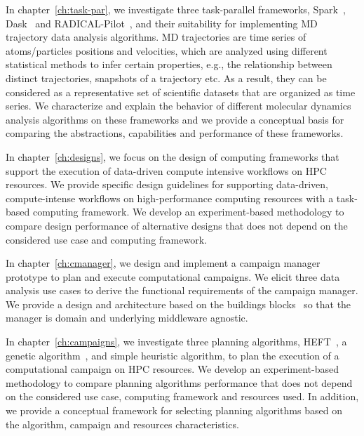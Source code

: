 In chapter~\ref{ch:task-par}, we investigate three task-parallel frameworks,
Spark~\cite{zaharia2010spark}, Dask~\cite{rocklin2015dask} and
RADICAL-Pilot~\cite{merzky2019using}, and their suitability for implementing
MD trajectory data analysis algorithms. MD trajectories are time series of
atoms/particles positions and velocities, which are analyzed using different
statistical methods to infer certain properties, e.g., the relationship
between distinct trajectories, snapshots of a trajectory etc. As a result,
they can be considered as a representative set of scientific datasets that are
organized as time series. We characterize and explain the behavior of
different molecular dynamics analysis algorithms on these frameworks and we
provide a conceptual basis for comparing the abstractions, capabilities and
performance of these frameworks.

In chapter~\ref{ch:designs}, we focus on the design of computing frameworks
that support the execution of data-driven compute intensive workflows on HPC
resources. We provide specific design guidelines for supporting data-driven,
compute-intense workflows on high-performance computing resources with a
task-based computing framework. We develop an experiment-based methodology to
compare design performance of alternative designs that does not depend on the
considered use case and computing framework.

In chapter~\ref{ch:cmanager}, we design and implement a campaign manager
prototype to plan and execute computational campaigns. We elicit three data
analysis use cases to derive the functional requirements of the campaign
manager. We provide a design and architecture based on the buildings
blocks~\cite{turilli2019middleware} so that the manager is domain and
underlying middleware agnostic.

In chapter~\ref{ch:campaigns}, we investigate three planning algorithms,
HEFT~\cite{topcuoglu2002performance}, a genetic
algorithm~\cite{page2005algorithm}, and simple heuristic algorithm, to plan
the execution of a computational campaign on HPC resources. We develop an
experiment-based methodology to compare planning algorithms performance that
does not depend on the considered use case, computing framework and resources
used. In addition, we provide a conceptual framework for selecting planning
algorithms based on the algorithm, campaign and resources characteristics.

